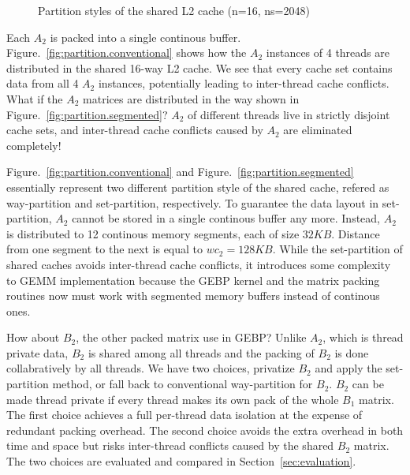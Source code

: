 \begin{figure}
  \centering
  \caption{Partition styles of the shared L2 cache (n=16, ns=2048)}
  \label{fig:partition}
\end{figure}

Each $A_2$ is packed into a single continous buffer.
Figure.~\ref{fig:partition.conventional} shows how the
$A_2$ instances of 4 threads are distributed in the shared 16-way L2 cache.
We see that every cache set contains data from all 4 $A_2$ instances,
potentially leading to inter-thread cache conflicts.
What if the $A_2$ matrices are distributed in the way shown in
Figure.~\ref{fig:partition.segmented}?
$A_2$ of different threads live in strictly disjoint cache sets,
and inter-thread cache conflicts caused by $A_2$ are eliminated completely!

Figure.~\ref{fig:partition.conventional} and Figure.~\ref{fig:partition.segmented}
essentially represent two different partition style of the shared cache,
refered as way-partition and set-partition, respectively.
To guarantee the data layout in set-partition,
$A_2$ cannot be stored in a single continous buffer any more.
Instead, $A_2$ is distributed to 12 continous memory segments, each of size $32KB$.
Distance from one segment to the next is equal to $wc_2=128KB$.
While the set-partition of shared caches avoids inter-thread cache conflicts,
it introduces some complexity to GEMM implementation
because the GEBP kernel and the matrix packing routines
now must work with segmented memory buffers instead of continous ones.

How about $B_2$, the other packed matrix use in GEBP?
Unlike $A_2$, which is thread private data,
$B_2$ is shared among all threads and
the packing of $B_2$ is done collabratively by all threads.
We have two choices, privatize $B_2$ and apply the set-partition method,
or fall back to conventional way-partition for $B_2$.
$B_2$ can be made thread private if every thread makes
its own pack of the whole $B_1$ matrix.
The first choice achieves a full per-thread data isolation
at the expense of redundant packing overhead.
The second choice avoids the extra overhead in both time and space
but risks inter-thread conflicts caused by the shared $B_2$ matrix.
The two choices are evaluated and compared in Section~\ref{sec:evaluation}.

